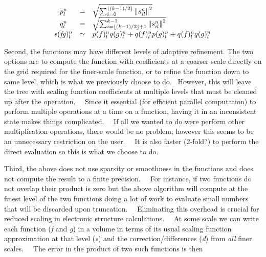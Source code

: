 \documentclass[letterpaper]{book}
\begin{document}
\begin{equation}
\begin{matrix}p_{l}^{n}&\text{=}&\sqrt{\sum _{i=0}^{\left\lfloor
(k-1)/2\right\rfloor}\left\|s_{il}^{n}\right\|^{2}}\hfill\null \\q_{l}^{n}&\text{=}&\sqrt{\sum _{i=\left\lfloor
(k-1)/2\right\rfloor+1}^{k-1}\left\|s_{il}^{n}\right\|^{2}}\hfill\null \\\epsilon (\mathit{fg})_{l}^{n}&\simeq
&p(f)_{l}^{n}q(g)_{l}^{n}+q(f)_{l}^{n}p(g)_{l}^{n}+q(f)_{l}^{n}q(g)_{l}^{n}\end{matrix}
\end{equation}

\bigskip

Second, the functions may have different levels of adaptive refinement. The two options are to compute the function with
coefficients at a coarser-scale directly on the grid required for the finer-scale function, or to refine the function
down to same level, which is what we previously choose to do. \ However, this will leave the tree with scaling function
coefficients at multiple levels that must be cleaned up after the operation. \ \ Since it essential (for efficient
parallel computation) to perform multiple operations at a time on a function, having it in an inconsistent state makes
things complicated. \ \ If all we wanted to do were perform other multiplication operations, there would be no problem;
however this seems to be an unnecessary restriction on the user. \ \ It is also faster (2-fold?) to perform the direct
evaluation so this is what we choose to do. \ 

Third, the above does not use sparsity or smoothness in the functions and does not compute the result to a finite
precision. \ \ For instance, if two functions do not overlap their product is zero but the above algorithm will compute
at the finest level of the two functions doing a lot of work to evaluate small numbers that will be discarded upon
truncation. \ \ Eliminating this overhead is crucial for reduced scaling in electronic structure calculations. \ \ At
some scale we can write each function (\textit{f} and \textit{g}) in a volume in terms of its usual scaling function
approximation at that level (\textit{s}) and the correction/differences (\textit{d}) from \textit{all }finer scales.
\ \ The error in the product of two such functions is then 
\end{document}
